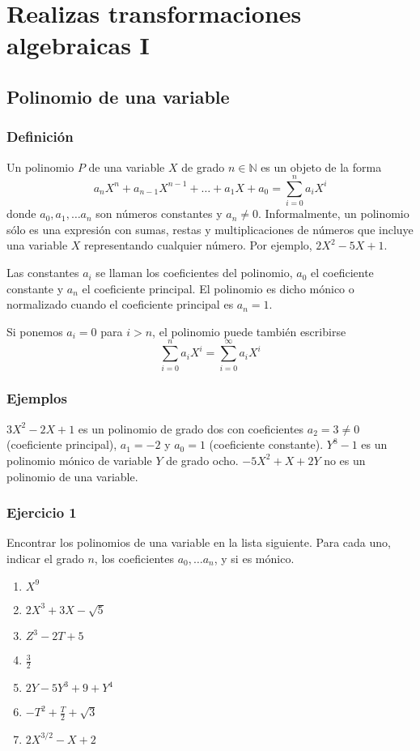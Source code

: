 \chapter{Realizas transformaciones algebraicas I}

\section{Polinomio de una variable}

\subsection*{Definición}

Un polinomio $P$ de una variable $X$ de grado $n \in \mathbb N$ es un objeto
de la forma
$$a_n X^n + a_{n-1} X^{n-1} + \ldots + a_1 X + a_0 = \sum_{i=0}^n a_i X^i$$
donde $a_0, a_1, \ldots a_n$ son números constantes y $a_n \neq 0$.
Informalmente, un polinomio sólo es una expresión con sumas, restas y
multiplicaciones de números que incluye una variable $X$ representando
cualquier número. Por ejemplo, $2X^2 - 5X + 1$.

Las constantes
$a_i$ se llaman los coeficientes del polinomio, $a_0$ el coeficiente constante
y $a_n$ el coeficiente principal. El polinomio es dicho mónico o normalizado
cuando el coeficiente principal es $a_n = 1$.

Si ponemos $a_i = 0$ para $i > n$, el polinomio puede también escribirse
$$
\sum_{i=0}^n a_i X^i = \sum_{i=0}^{\infty} a_i X^i
$$

\subsection*{Ejemplos}

$3 X^2 - 2 X + 1$ es un polinomio de grado dos con coeficientes $a_2=3\neq0$
(coeficiente principal), $a_1=-2$ y $a_0=1$ (coeficiente constante).
$Y^8 - 1$ es un polinomio mónico de variable $Y$ de grado ocho.
$-5X^2 + X + 2Y$ no es un polinomio de una variable.

\subsection*{Ejercicio 1}

Encontrar los polinomios de una variable en la lista siguiente.
Para cada uno, indicar el grado $n$,
los coeficientes $a_0, \ldots a_n$, y si es mónico.

\begin{enumerate}
\item $X^9$
\item $2 X^3 + 3X - \sqrt{5}$
\item $Z^3 - 2T + 5$
\item $\frac{3}{2}$
\item $2Y - 5Y^3 + 9 + Y^4$
\item $-T^2 + \frac{T}{2} + \sqrt{3}$
\item $2 X^{3/2} - X + 2$
\end{enumerate}

